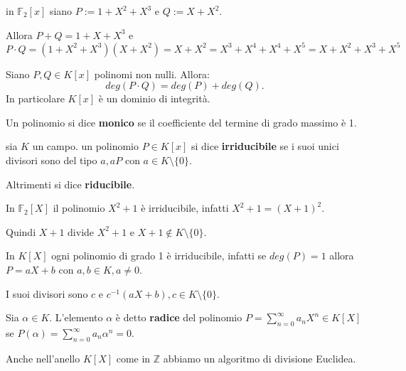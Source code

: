 \documentclass[../main.tex]{subfiles}
\begin{document}
\begin{example}
    in $\mathbb{F}_2[x]$ siano $P := 1 + X^2 + X^3$ e $Q:= X + X^2$.

    Allora $P+Q = 1 + X + X^3$ e $P \cdot Q = (1 + X^2 + X^3)(X + X^2) = X + X^2 = X^3 + X^4 + X^4 + X^5 = X + X^2 + X^3 + X^5$
\end{example}

\begin{proposition}
    Siano $P,Q \in K[x]$ polinomi non nulli. Allora:
    \begin{equation*}
        deg(P \cdot Q) = deg(P) + deg(Q).
    \end{equation*}
    In particolare $K[x]$ è un dominio di integrità.
\end{proposition}

\begin{definition}
    Un polinomio si dice \textbf{monico} se il coefficiente del termine di grado massimo è 1.
\end{definition}

\begin{definition}
    sia $K$ un campo. un polinomio $P \in K[x]$ si dice \textbf{irriducibile} se i suoi unici divisori sono del tipo $a, aP$ con $a \in K \setminus \{0\}$.

    Altrimenti si dice \textbf{riducibile}.
\end{definition}

\begin{example}
    In $\mathbb{F}_2[X]$ il polinomio $X^2 + 1$ è irriducibile, infatti $X^2 + 1 = (X + 1)^2$.

    Quindi $X + 1$ divide $X^2 + 1$ e $X + 1 \notin K \setminus \{0\}$.
\end{example}

\begin{example}
    In $K[X]$ ogni polinomio di grado 1 è irriducibile, infatti se $deg(P) = 1$ allora $P = aX + b$ con $a,b \in K, a \neq 0$.

    I suoi divisori sono $c$ e $c^{-1} (aX + b), c \in K \setminus \{0\}$.
\end{example}

\begin{definition}
    Sia $\alpha \in K$. L'elemento $\alpha$ è detto \textbf{radice} del polinomio $P = \sum_{n=0}^{\infty} a_n X^n \in K[X]$ se $P(\alpha) = \sum_{n=0}^{\infty} a_n \alpha^n = 0$.
\end{definition}

Anche nell'anello $K[X]$ come in $\mathbb{Z}$ abbiamo un algoritmo di divisione Euclidea.
\end{document}
